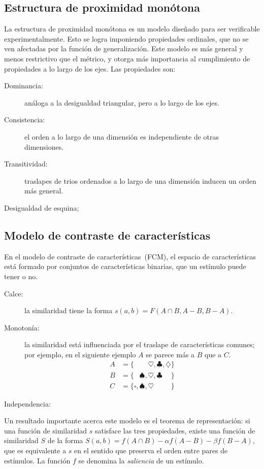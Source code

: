 \documentclass[spanish]{article}
\newcommand{\SMA}{\square}
\newcommand{\SMB}{\spadesuit}
\newcommand{\SMC}{\heartsuit}
\newcommand{\SMD}{\clubsuit}
\newcommand{\SME}{\diamondsuit}
\begin{document}
\subsection{Estructura de proximidad monótona}
La estructura de proximidad monótona es un modelo diseñado para ser verificable experimentalmente.
Esto se logra imponiendo propiedades ordinales, que no se ven afectadas por la función de
generalización.  Este modelo es más general y menos restrictivo que el métrico, y otorga
más importancia al cumplimiento de propiedades a lo largo de los ejes.  Las propiedades son:
\begin{description}
    \item [Dominancia:]
        análoga a la desigualdad triangular, pero a lo largo de los ejes.
    \item [Consistencia:]
        el orden a lo largo de una dimensión es independiente de otras dimensiones.
    \item [Transitividad:]
        traslapes de trios ordenados a lo largo de una dimensión inducen un orden más general.
    \item [Desigualdad de esquina;]
\end{description}



\subsection{Modelo de contraste de características}
En el modelo de contraste de características~(FCM), el espacio de características está formado por
conjuntos de características binarias, que un estímulo puede tener o no.
\begin{description}
    \item [Calce:] la similaridad tiene la forma $s(a, b) = F(A\cap B, A-B, B-A)$.
    \item [Monotonía:] la similaridad está influenciada por el traslape de características comunes;
        por ejemplo, en el siguiente ejemplo $A$ se parece más a $B$ que a $C$.
        \begin{align*}
            A &= \{\phantom{\SMA,  \SMB,} \SMC,          \SMD,          \SME\}  \\
            B &= \{\phantom{\SMA,} \SMB,  \SMC,          \SMD\phantom{, \SME}\} \\
            C &=          \{\SMA,  \SMB,  \SMC\phantom{, \SMD,          \SME}\}
        \end{align*}
    \item [Independencia:]
\end{description}
Un resultado importante acerca este modelo es el teorema de representación: si una función de
similaridad $s$ satisface las tres propiedades, existe una función de similaridad $S$ de la forma
$S(a, b) = f(A\cap B) - \alpha f(A-B) - \beta f(B-A)$, que es equivalente a $s$ en el sentido que
preserva el orden entre pares de estímulos.  La función $f$ se denomina la \emph{saliencia} de un
estímulo.
\end{document}
